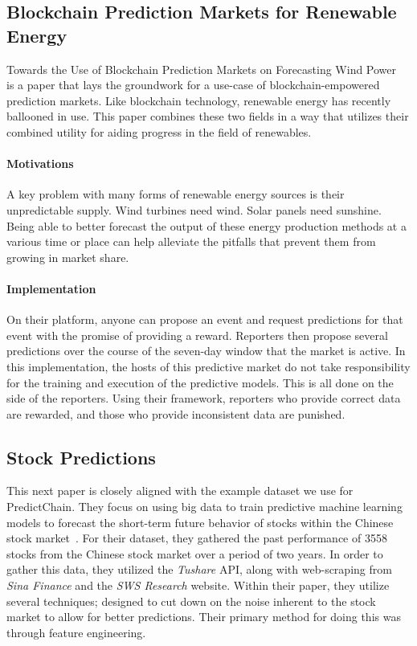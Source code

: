 \documentclass{ledger}
\begin{document}
\subsection{Blockchain Prediction Markets for Renewable Energy}

Towards the Use of Blockchain Prediction Markets on Forecasting Wind Power~\cite{windForcasting} is a paper that lays the groundwork for a use-case of blockchain-empowered prediction markets. Like blockchain technology, renewable energy has recently ballooned in use.  This paper combines these two fields in a way that utilizes their combined utility for aiding progress in the field of renewables.

\paragraph{Motivations}
A key problem with many forms of renewable energy sources is their unpredictable supply. Wind turbines need wind. Solar panels need sunshine. Being able to better forecast the output of these energy production methods at a various time or place can help alleviate the pitfalls that prevent them from growing in market share.

\paragraph{Implementation}
On their platform, anyone can propose an event and request predictions for that event with the promise of providing a reward.  Reporters then propose several predictions over the course of the seven-day window that the market is active.  In this implementation, the hosts of this predictive market do not take responsibility for the training and execution of the predictive models.  This is all done on the side of the reporters.  Using their framework, reporters who provide correct data are rewarded, and those who provide inconsistent data are punished.

\subsection{Stock Predictions}

This next paper is closely aligned with the example dataset we use for PredictChain.  They focus on using big data to train predictive machine learning models to forecast the short-term future behavior of stocks within the Chinese stock market~\cite{deepPrediction}.  For their dataset, they gathered the past performance of 3558 stocks from the Chinese stock market over a period of two years.  In order to gather this data, they utilized the \textit{Tushare} API, along with web-scraping from \textit{Sina Finance} and the \textit{SWS Research} website. Within their paper, they utilize several techniques; designed to cut down on the noise inherent to the stock market to allow for better predictions.  Their primary method for doing this was through feature engineering.
\end{document}
